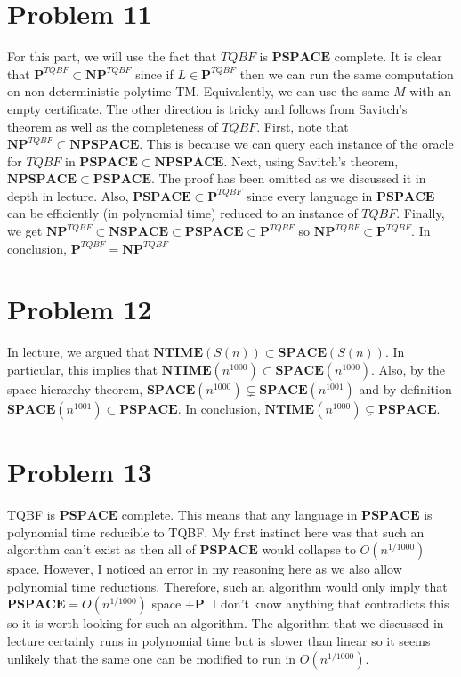 \documentclass[usletter]{article}
\begin{document}
\section*{Problem 11}
For this part, we will use the fact that \(TQBF\) is \(\mathbf{PSPACE}\) complete. It is clear that \(\mathbf{P}^{TQBF} \subset \mathbf{NP}^{TQBF}\) since if \(L \in \mathbf{P}^{TQBF}\) then we 
can run the same computation on non-deterministic polytime TM. Equivalently, we can use the same \(M\) with an empty certificate. The other direction is tricky and follows from Savitch's theorem as well as the completeness of
\(TQBF\). First, note that \(\mathbf{NP}^{TQBF} \subset \mathbf{NPSPACE}\). This is because we can query each instance of the oracle for \(TQBF\) in \(\mathbf{PSPACE} \subset \mathbf{NPSPACE}\). Next, using Savitch's theorem, \(\mathbf{NPSPACE} \subset \mathbf{PSPACE}\). The proof has
been omitted as we discussed it in depth in lecture. Also, \(\mathbf{PSPACE} \subset \mathbf{P}^{TQBF}\) since every language in \(\mathbf{PSPACE}\) can be efficiently (in polynomial time) reduced to an instance of \(TQBF\). Finally, we get \(\mathbf{NP}^{TQBF} \subset \mathbf{NSPACE} 
\subset \mathbf{PSPACE} \subset \mathbf{P}^{TQBF}\) so \(\mathbf{NP}^{TQBF} \subset \mathbf{P}^{TQBF}\). In conclusion, \(\mathbf{P}^{TQBF} = \mathbf{NP}^{TQBF}\)


\newpage

\section*{Problem 12}
In lecture, we argued that \(\mathbf{NTIME}(S(n)) \subset \mathbf{SPACE}(S(n))\). In particular, this implies that
\(\mathbf{NTIME}(n^{1000}) \subset \mathbf{SPACE}(n^{1000})\). Also, by the space hierarchy theorem, \(\mathbf{SPACE}(n^{1000}) \subsetneq \mathbf{SPACE}(n^{1001})\)
and by definition \(\mathbf{SPACE}(n^{1001}) \subset \mathbf{PSPACE}\). In conclusion, \(\mathbf{NTIME}(n^{1000}) \subsetneq \mathbf{PSPACE}\).


\newpage

\section*{Problem 13}

TQBF is \(\mathbf{PSPACE}\) complete. This means that any language in \(\mathbf{PSPACE}\) is polynomial time reducible to TQBF. My first instinct here was that such an algorithm can't exist as then 
all of \(\mathbf{PSPACE}\) would collapse to \(O(n^{1/1000})\) space. However, I noticed an error in my reasoning here as we also allow polynomial time reductions. Therefore, such an algorithm would only imply 
that \(\mathbf{PSPACE} = O(n^{1/1000})\) space \(+ \mathbf{P}\). I don't know anything that contradicts this so it is worth looking for such an algorithm. The algorithm that we discussed in lecture certainly runs in polynomial time
but is slower than linear so it seems unlikely that the same one can be modified to run in \(O(n^{1/1000})\).

\newpage
\end{document}
